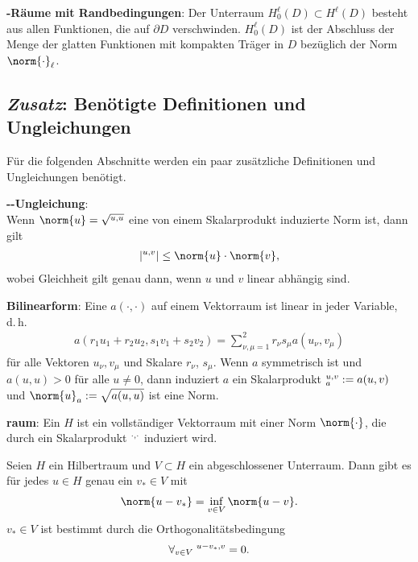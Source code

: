 \linie

\textbf{-Räume mit Randbedingungen}:
Der Unterraum $H_0^\ell(D) \subset H^\ell(D)$ besteht aus allen Funktionen, die auf $\partial D$
verschwinden.
$H_0^\ell(D)$ ist der Abschluss der Menge der glatten Funktionen mit kompakten Träger in $D$
bezüglich der Norm $\norm{\cdot}_\ell$.

\subsection{%
    \emph{Zusatz}:
    Benötigte Definitionen und Ungleichungen%
}

Für die folgenden Abschnitte werden ein paar zusätzliche Definitionen und Ungleichungen benötigt.

\linie

\textbf{--Ungleichung}:\\
Wenn $\norm{u} = \sqrt{\sp{u, u}}$ eine von einem Skalarprodukt induzierte Norm ist,
dann gilt
\begin{align*}
    |\sp{u, v}| \le \norm{u} \cdot \norm{v},
\end{align*}
wobei Gleichheit gilt genau dann, wenn $u$ und $v$ linear abhängig sind.

\linie

\textbf{Bilinearform}:
Eine  $a(\cdot, \cdot)$ auf einem Vektorraum ist linear in
jeder Variable, d.\,h.
\begin{align*}
    a(r_1 u_1 + r_2 u_2, s_1 v_1 + s_2 v_2) = \sum_{\nu,\mu=1}^2 r_\nu s_\mu a(u_\nu, v_\mu)
\end{align*}
für alle Vektoren $u_\nu, v_\mu$ und Skalare $r_\nu$, $s_\mu$.
Wenn $a$ symmetrisch ist und $a(u, u) > 0$ für alle $u \not= 0$,
dann induziert $a$ ein Skalarprodukt $\sp{u, v}_a := a(u, v)$ und
$\norm{u}_a := \sqrt{a(u, u)}$ ist eine Norm.

\linie

\textbf{raum}:
Ein  $H$ ist ein vollständiger Vektorraum mit einer Norm
$\norm{\cdot}$, die durch ein Skalarprodukt $\sp{\cdot, \cdot}$ induziert wird.

Seien $H$ ein Hilbertraum und $V \subset H$ ein abgeschlossener Unterraum.
Dann gibt es für jedes $u \in H$ genau ein $v_\ast \in V$ mit
\begin{align*}
    \norm{u - v_\ast} = \inf_{v \in V} \norm{u - v}.
\end{align*}
$v_\ast \in V$ ist bestimmt durch die Orthogonalitätsbedingung
\begin{align*}
    \forall_{v \in V}\; \sp{u - v_\ast, v} = 0.
\end{align*}

